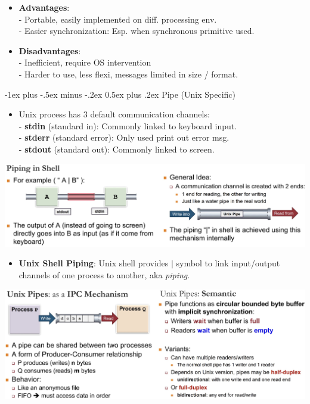 \documentclass[10pt, landscape]{article}
\makeatletter
\renewcommand{\section}{\@startsection{section}{1}{0mm}%
                                {-1ex plus -.5ex minus -.2ex}%
                                {0.5ex plus .2ex}%
                                {\normalfont\large\bfseries}}
\makeatother
\begin{document}
\begin{multicols*}{3}
\begin{itemize}
\item \textbf{Advantages}: \\
- Portable, easily implemented on diff. processing env. \\
- Easier synchronization: Esp. when synchronous primitive used.
\item \textbf{Disadvantages}: \\
- Inefficient, require OS intervention \\
- Harder to use, less flexi, messages limited in size / format.
\end{itemize}

\section{Pipe (Unix Specific)}
\begin{itemize}
\item Unix process has 3 default communication channels: \\
- \textbf{stdin} (standard in): Commonly linked to keyboard input. \\
- \textbf{stderr} (standard error): Only used print out error msg. \\
- \textbf{stdout} (standard out): Commonly linked to screen. 
\end{itemize}
\centerline{\includegraphics[width=0.90\linewidth]{piping1}}

\begin{itemize}
\item \textbf{Unix Shell Piping}: Unix shell provides $|$ symbol to link input/output channels of one process to another, aka \textit{piping}.
\end{itemize}

\centerline{\includegraphics[width=1\linewidth]{piping2}}


\end{multicols*}
\end{document}
